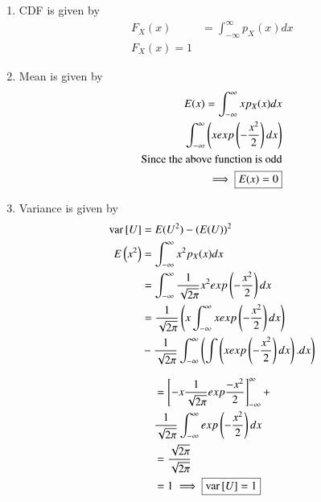 \documentclass[journal,12pt,twocolumn]{IEEEtran}
\begin{document}
\solution 
\begin{enumerate}
    \item CDF is given by 
    \begin{align}
        F_X(x)&=\int_{-\infty}^{\infty}p_X(x)dx\\
        \boxed{F_X(x)=1}
    \end{align}
    \item Mean is given by
    \begin{align*}
        E(x)=\int_{-\infty}^{\infty}xp_X(x)dx\\
        \int_{-\infty}^{\infty} \left(x exp\left(-\frac{x^2}{2}\right)dx\right)\\
        \text{Since the above function is odd}\\
        \implies \boxed{E(x)=0}
    \end{align*}
    \item Variance is given by
    \begin{align*}
        \text{var}{}\left[U\right]&=E(U^2)-(E(U))^2\\
E\left(x^2\right)&=\int_{-\infty}^{\infty}x^2p_X(x)dx \\
&=\int_{-\infty}^{\infty}\frac{1}{\sqrt{2\pi}}x^2exp\left(-\frac{x^2}{2}\right)dx \\
&=\frac{1}{\sqrt{2\pi}}\left(x\int_{-\infty}^{\infty} x exp\left(-\frac{x^2}{2}\right)dx\right)
\\ &  -\frac{1}{\sqrt{2\pi}}\int_{-\infty}^{\infty}\left( \int \left(x exp\left(-\frac{x^2}{2}\right)dx\right). dx\right)\\
\end{align*}
    
\begin{align*}
&=\left[-x\frac{1}{\sqrt{2\pi}} exp{\frac{-x^2}{2}}\right]_{-\infty}^{\infty}+\\ &\frac{1}{\sqrt{2\pi}}\int_{-\infty}^{\infty}exp\left(-\frac{x^2}{2}\right)dx \\
&=\frac{\sqrt{2\pi}}{\sqrt{2\pi}}\\&=1
        \implies\boxed{\text{var}{}\left[U\right]=1}
    \end{align*}
\end{enumerate}
\end{document}
